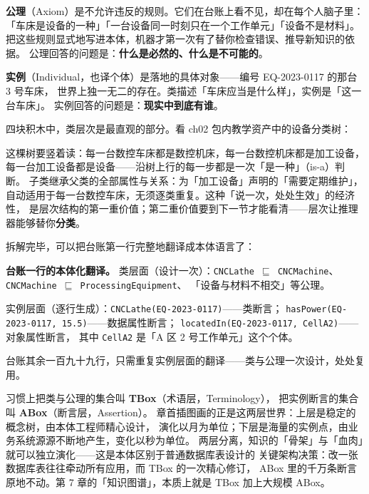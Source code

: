 \textbf{公理}（Axiom）是不允许违反的规则。它们在台账上看不见，却在每个人脑子里：
「车床是设备的一种」「一台设备同一时刻只在一个工作单元」「设备不是材料」。
把这些规则显式地写进本体，机器才第一次有了替你检查错误、推导新知识的依据。
公理回答的问题是：\textbf{什么是必然的、什么是不可能的}。

\textbf{实例}（Individual，也译个体）是落地的具体对象——编号 EQ-2023-0117 的那台 3 号车床，
世界上独一无二的存在。类描述「车床应当是什么样」，实例是「这一台车床」。
实例回答的问题是：\textbf{现实中到底有谁}。

四块积木中，类层次是最直观的部分。看 ch02 包内教学资产中的设备分类树：



这棵树要竖着读：每一台数控车床都是数控机床，每一台数控机床都是加工设备，
每一台加工设备都是设备——沿树上行的每一步都是一次「是一种」（is-a）判断。
子类继承父类的全部属性与关系：为「加工设备」声明的「需要定期维护」，
自动适用于每一台数控车床，无须逐类重复。这种「说一次，处处生效」的经济性，
是层次结构的第一重价值；第二重价值要到下一节才能看清——层次让推理器能够替你\textbf{分类}。

拆解完毕，可以把台账第一行完整地翻译成本体语言了：

\begin{noteblock}
\textbf{台账一行的本体化翻译。}
类层面（设计一次）：\texttt{CNCLathe \(\sqsubseteq\) CNCMachine}、
\texttt{CNCMachine \(\sqsubseteq\) ProcessingEquipment}、
「设备与材料不相交」等公理。\par
实例层面（逐行生成）：\texttt{CNCLathe(EQ-2023-0117)}——类断言；
\texttt{hasPower(EQ-2023-0117, 15.5)}——数据属性断言；
\texttt{locatedIn(EQ-2023-0117, CellA2)}——对象属性断言，
其中 \texttt{CellA2} 是「A 区 2 号工作单元」这个个体。\par
台账其余一百九十九行，只需重复实例层面的翻译——类与公理一次设计，处处复用。
\end{noteblock}

习惯上把类与公理的集合叫 \textbf{TBox}（术语层，Terminology），
把实例断言的集合叫 \textbf{ABox}（断言层，Assertion）。
章首插图画的正是这两层世界：上层是稳定的概念树，由本体工程师精心设计，
演化以月为单位；下层是海量的实例点，由业务系统源源不断地产生，变化以秒为单位。
两层分离，知识的「骨架」与「血肉」就可以独立演化——这是本体区别于普通数据库表设计的
关键架构决策：改一张数据库表往往牵动所有应用，而 TBox 的一次精心修订，
ABox 里的千万条断言原地不动。第 7 章的「知识图谱」，本质上就是 TBox 加上大规模 ABox。


